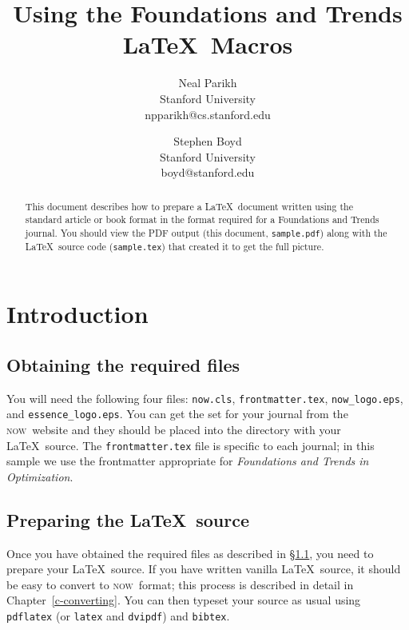 \documentclass[openany]{now} %
\title{Using the Foundations and Trends\textsuperscript{\textregistered} \LaTeX\ Macros}
\author{
Neal Parikh \\
Stanford University \\
npparikh@cs.stanford.edu
\and
Stephen Boyd \\
Stanford University \\
boyd@stanford.edu
}
\newcommand{\now}{\textsc{now}}
\begin{document}

\frontmatter  %

\maketitle

\tableofcontents

\mainmatter

\begin{abstract}
This document describes how to prepare a \LaTeX\ document written using the
standard article or book format in the format required for a Foundations and
Trends\textsuperscript{\textregistered}  journal.  You should view the PDF
output (this document, \texttt{sample.pdf}) along with the \LaTeX\ source code
(\texttt{sample.tex}) that created it to get the full picture.
\end{abstract}

\chapter{Introduction}
\label{c-intro} %

\section{Obtaining the required files}
\label{s-files} %

You will need the following four files: 
\texttt{now.cls}, 
\texttt{frontmatter.tex},
\texttt{now\_logo.eps}, and 
\texttt{essence\_logo.eps}.
You can get the set for your journal from the \now\ website and they
should be placed into the directory with your \LaTeX\ source. The
\texttt{frontmatter.tex} file is specific to each journal; in this sample we
use the frontmatter appropriate for \emph{Foundations and
Trends\textsuperscript{\textregistered}  in Optimization}.

\section{Preparing the \LaTeX\ source}

Once you have obtained the required files as described in \S\ref{s-files}, you
need to prepare your \LaTeX\ source.  If you have written vanilla \LaTeX\
source, it should be easy to convert to \now\ format; this process is described
in detail in Chapter~\ref{c-converting}. You can then typeset your source as
usual \citep{Lam:94} using \texttt{pdflatex} (or \texttt{latex} and \texttt{dvipdf})
and \texttt{bibtex}.
\end{document}
